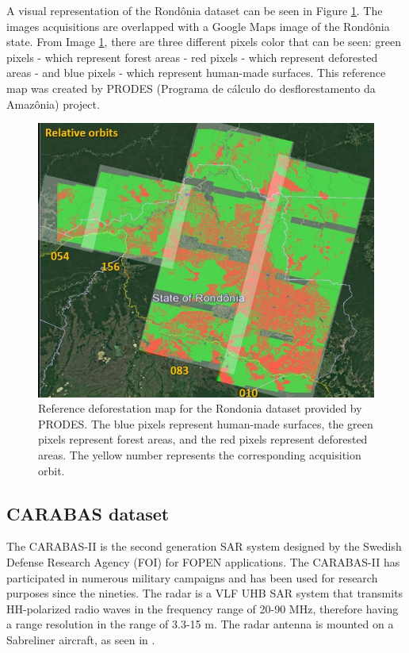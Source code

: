 A visual representation of the Rondônia dataset can be seen in Figure \ref{fig:rondoniadataset}. The images acquisitions are overlapped with a Google Maps image of the Rondônia state. From Image \ref{fig:rondoniadataset}, there are three different pixels color that can be seen: green pixels - which represent forest areas - red pixels - which represent deforested areas - and blue pixels - which represent human-made surfaces. This reference map was created by PRODES (Programa de cálculo do desflorestamento da Amazônia) project.

\begin{figure}[H]
    \centering
    \includegraphics[width=\linewidth]{Cap2-Methods/rondonia_dataset.jpg}
    \caption{ Reference deforestation map for the Rondonia dataset provided by PRODES. The blue pixels represent human-made surfaces, the green pixels represent forest areas, and the red pixels represent deforested areas. The yellow number represents the corresponding acquisition orbit.}
    \label{fig:rondoniadataset}
\end{figure}{}

\subsection{CARABAS dataset}

The CARABAS-II is the second generation SAR system designed by the Swedish Defense Research Agency (FOI) for FOPEN applications.
The CARABAS-II has participated in numerous military campaigns and has been used for research purposes since the nineties.
The radar is a VLF UHB SAR system that transmits HH-polarized radio waves in the frequency range of 
20-90 MHz, therefore having a range resolution in the range of 3.3-15 m. The radar antenna is mounted on a Sabreliner aircraft, as seen in .

